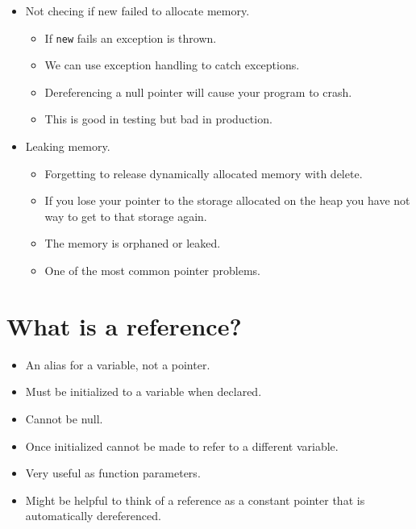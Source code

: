 \begin{itemize}
    \item Not checing if new failed to allocate memory.
        \begin{itemize}
            \item If \texttt{new} fails an exception is thrown.
            \item We can use exception handling to catch exceptions.
            \item Dereferencing a null pointer will cause your program to crash.
            \item This is good in testing but bad in production.
        \end{itemize}

    \item Leaking memory.
        \begin{itemize}
            \item Forgetting to release dynamically allocated memory with delete.
            \item If you lose your pointer to the storage allocated on the heap you have not way to get to that storage again.
            \item The memory is orphaned or leaked.
            \item One of the most common pointer problems.
        \end{itemize}
\end{itemize}


\section{What is a reference?}
\begin{itemize}
    \item An alias for a variable, not a pointer.
    \item Must be initialized to a variable when declared.
    \item Cannot be null.
    \item Once initialized cannot be made to refer to a different variable.
    \item Very useful as function parameters.
    \item Might be helpful to think of a  reference as a constant pointer that is automatically dereferenced.   
\end{itemize}

